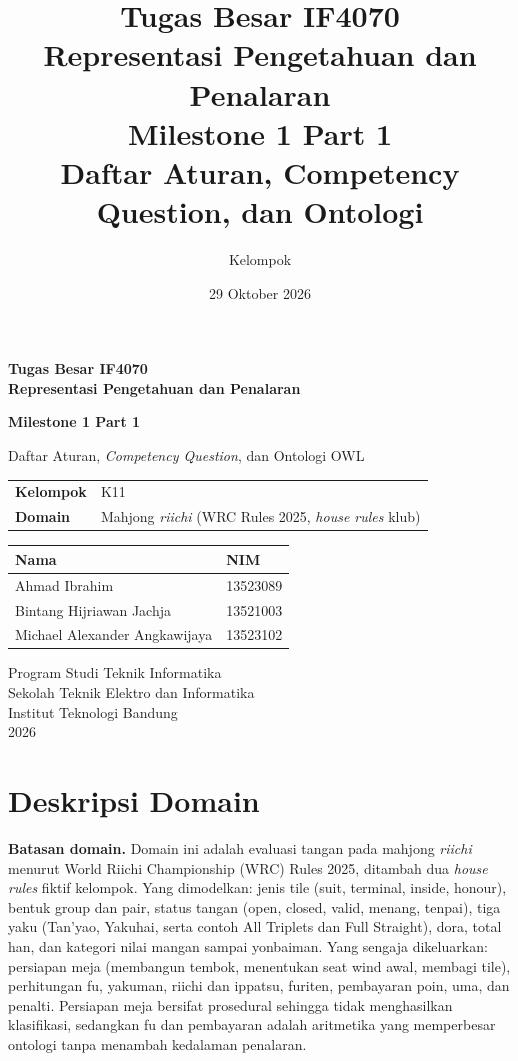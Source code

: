 \documentclass[11pt,a4paper]{article}
\title{\textbf{Tugas Besar IF4070\\Representasi Pengetahuan dan Penalaran}\\[6pt]
       \large Milestone 1 Part 1\\Daftar Aturan, Competency Question, dan Ontologi}
\author{Kelompok \grup}
\date{29 Oktober 2026}
\newcommand{\grup}{K11}   %
\begin{document}
\begin{titlepage}
\centering
\vspace*{2cm}
{\Large\bfseries Tugas Besar IF4070\\ Representasi Pengetahuan dan Penalaran\par}
\vspace{1.2cm}
{\LARGE\bfseries Milestone 1 Part 1\par}
\vspace{0.4cm}
{\large Daftar Aturan, \emph{Competency Question}, dan Ontologi OWL\par}
\vspace{2cm}

\begin{tabular}{ll}
\toprule
\textbf{Kelompok} & \grup \\
\textbf{Domain}   & Mahjong \emph{riichi} (WRC Rules 2025, \emph{house rules} klub) \\
\bottomrule
\end{tabular}

\vspace{1.5cm}
\begin{tabular}{ll}
\toprule
\textbf{Nama} & \textbf{NIM} \\
\midrule
Ahmad Ibrahim & 13523089 \\
Bintang Hijriawan Jachja & 13521003 \\
Michael Alexander Angkawijaya & 13523102 \\
\bottomrule
\end{tabular}

\vfill
{\small Program Studi Teknik Informatika\\
Sekolah Teknik Elektro dan Informatika\\
Institut Teknologi Bandung\\[4pt]
2026\par}
\end{titlepage}

\section{Deskripsi Domain}

\textbf{Batasan domain.} Domain ini adalah evaluasi tangan pada mahjong \emph{riichi}
menurut World Riichi Championship (WRC) Rules 2025, ditambah dua \emph{house rules}
fiktif kelompok. Yang dimodelkan: jenis tile (suit, terminal, inside, honour),
bentuk group dan pair, status tangan (open, closed, valid, menang, tenpai), tiga
yaku (Tan'yao, Yakuhai, serta contoh All Triplets dan Full Straight), dora, total han,
dan kategori nilai mangan sampai yonbaiman. Yang sengaja dikeluarkan: persiapan
meja (membangun tembok, menentukan seat wind awal, membagi tile), perhitungan fu,
yakuman, riichi dan ippatsu, furiten, pembayaran poin, uma, dan penalti. Persiapan
meja bersifat prosedural sehingga tidak menghasilkan klasifikasi, sedangkan fu dan
pembayaran adalah aritmetika yang memperbesar ontologi tanpa menambah kedalaman
penalaran.
\end{document}
